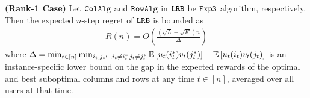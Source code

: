 
\begin{theorem} \textbf{(Rank-1 Case)}
\label{thm:upper bound} Let ${\tt ColAlg}$ and ${\tt RowAlg}$ in ${\tt LRB}$ be ${\tt Exp3}$ algorithm, respectively. Then the expected $n$-step regret of ${\tt LRB}$ is bounded as
\begin{align*}
  R(n) = O\left(\frac{\left(\sqrt{L } + \sqrt{K }\right)n}{\Delta}\right)
\end{align*}
where $\Delta = \min_{t \in [n]} \min_{i_t,j_t:\ , i_t \neq i^*_t \, j_t \neq j^*_t} \mathbb{E}\left[u_t(i^*_t)v_t(j^*_t)\right] - \mathbb{E}\left[u_t(i_t)v_t(j_t)\right]$  is an instance-specific lower bound on the gap in the expected rewards of the optimal and best suboptimal columns and rows at any time $t \in [n]$, averaged over all users at that time.  


\end{theorem}

